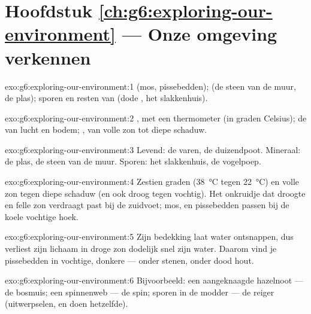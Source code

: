 \section*{Hoofdstuk \ref{ch:g6:exploring-our-environment} --- Onze omgeving verkennen}

\begin{solution}{exo:g6:exploring-our-environment:1}
 (mos, pissebedden);  (de steen van de
muur, de plas); sporen en resten van  (dode , het
slakkenhuis).
\end{solution}

\begin{solution}{exo:g6:exploring-our-environment:2}
, met een thermometer (in graden Celsius); de  van
lucht en bodem; , van volle zon tot diepe schaduw.
\end{solution}

\begin{solution}{exo:g6:exploring-our-environment:3}
Levend: de varen, de duizendpoot. Mineraal: de plas, de steen van de
muur. Sporen: het slakkenhuis, de vogelpoep.
\end{solution}

\begin{solution}{exo:g6:exploring-our-environment:4}
Zestien graden (\qty{38}{\degreeCelsius} tegen
\qty{22}{\degreeCelsius}) en volle zon tegen diepe schaduw (en ook droog
tegen vochtig). Het onkruidje dat droogte en felle zon verdraagt past bij
de zuidvoet; mos,  en pissebedden passen bij de koele vochtige hoek.
\end{solution}

\begin{solution}{exo:g6:exploring-our-environment:5}
Zijn bedekking laat water ontsnappen, dus verliest zijn lichaam in droge
zon dodelijk snel zijn water. Daarom vind je pissebedden in vochtige,
donkere  --- onder stenen, onder dood hout.
\end{solution}

\begin{solution}{exo:g6:exploring-our-environment:6}
Bijvoorbeeld: een aangeknaagde hazelnoot --- de bosmuis; een spinnenweb
--- de spin; sporen in de modder --- de reiger (uitwerpselen,  en
 doen hetzelfde).
\end{solution}

